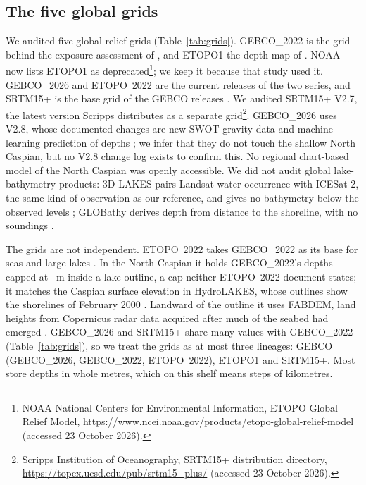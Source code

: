 \subsection{The five global grids}
\label{sec:grids}
We audited five global relief grids (Table~\ref{tab:grids}). GEBCO\_2022 \citep{gebco2022} is the grid behind the exposure assessment of \citet{court2025}, and ETOPO1 \citep{amante2009} the depth map of \citet{akbari2020}. NOAA now lists ETOPO1 as deprecated\footnote{NOAA National Centers for Environmental Information, ETOPO Global Relief Model, \url{https://www.ncei.noaa.gov/products/etopo-global-relief-model} (accessed 23 October 2026).}; we keep it because that study used it. GEBCO\_2026 \citep{gebco2026} and ETOPO~2022 \citep{etopo2022,macferrin2025} are the current releases of the two series, and SRTM15+ \citep{tozer2019} is the base grid of the GEBCO releases \citep{gebco2026}. We audited SRTM15+ V2.7, the latest version Scripps distributes as a separate grid\footnote{Scripps Institution of Oceanography, SRTM15+ distribution directory, \url{https://topex.ucsd.edu/pub/srtm15_plus/} (accessed 23 October 2026).}. GEBCO\_2026 uses V2.8, whose documented changes are new SWOT gravity data and machine-learning prediction of depths \citep{gebco2026}; we infer that they do not touch the shallow North Caspian, but no V2.8 change log exists to confirm this. No regional chart-based model of the North Caspian was openly accessible. We did not audit global lake-bathymetry products: 3D-LAKES pairs Landsat water occurrence with ICESat-2, the same kind of observation as our reference, and gives no bathymetry below the observed levels \citep{huang2025}; GLOBathy derives depth from distance to the shoreline, with no soundings \citep{khazaei2022}.

The grids are not independent. ETOPO~2022 takes GEBCO\_2022 as its base for seas and large lakes \citep{macferrin2025}. In the North Caspian it holds GEBCO\_2022's depths capped at ~m inside a lake outline, a cap neither ETOPO~2022 document states; it matches the Caspian surface elevation in HydroLAKES, whose outlines show the shorelines of February 2000 \citep{hydrolakes_doc,messager2016}. Landward of the outline it uses FABDEM, land heights from Copernicus radar data acquired after much of the seabed had emerged \citep{hawker2022,copdem_handbook_i5}. GEBCO\_2026 and SRTM15+ share many values with GEBCO\_2022 (Table~\ref{tab:grids}), so we treat the grids as at most three lineages: GEBCO (GEBCO\_2026, GEBCO\_2022, ETOPO~2022), ETOPO1 and SRTM15+. Most store depths in whole metres, which on this shelf means steps of kilometres.

